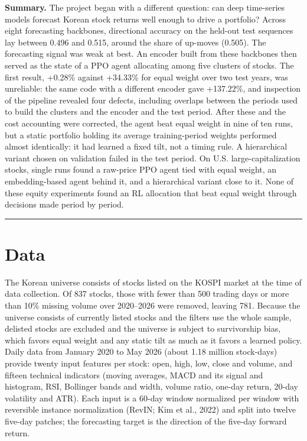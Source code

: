 \documentclass[12pt,a4paper]{report}
\begin{document}
\textbf{Summary.} The project began with a different question: can deep
time-series models forecast Korean stock returns well enough to drive a
portfolio? Across eight forecasting backbones, directional accuracy on
the held-out test sequences lay between 0.496 and 0.515, around the
share of up-moves (0.505). The forecasting signal was weak at best. An
encoder built from these backbones then served as the state of a PPO
agent allocating among five clusters of stocks. The first result,
+0.28\% against +34.33\% for equal weight over two test years, was
unreliable: the same code with a different encoder gave +137.22\%, and
inspection of the pipeline revealed four defects, including overlaps
between the periods used to build the clusters and the encoder and the
test period. After these and the cost accounting were corrected, the
agent beat equal weight in nine of ten runs, but a static portfolio
holding its average training-period weights performed almost
identically: it had learned a fixed tilt, not a timing rule. A
hierarchical variant chosen on validation failed in the test period. On
U.S. large-capitalization stocks, single runs found a raw-price PPO
agent tied with equal weight, an embedding-based agent behind it, and a
hierarchical variant close to it. None of these equity experiments found
an RL allocation that beat equal weight through decisions made period by
period.

\begin{center}\rule{0.5\linewidth}{0.5pt}\end{center}

\section{Data}\label{data}

The Korean universe consists of stocks listed on the KOSPI market at the
time of data collection. Of 837 stocks, those with fewer than 500
trading days or more than 10\% missing volume over 2020--2026 were
removed, leaving 781. Because the universe consists of currently listed
stocks and the filters use the whole sample, delisted stocks are
excluded and the universe is subject to survivorship bias, which favors
equal weight and any static tilt as much as it favors a learned policy.
Daily data from January 2020 to May 2026 (about 1.18 million stock-days)
provide twenty input features per stock: open, high, low, close and
volume, and fifteen technical indicators (moving averages, MACD and its
signal and histogram, RSI, Bollinger bands and width, volume ratio,
one-day return, 20-day volatility and ATR). Each input is a 60-day
window normalized per window with reversible instance normalization
(RevIN; Kim et al., 2022) and split into twelve five-day patches; the
forecasting target is the direction of the five-day forward return.
\end{document}
